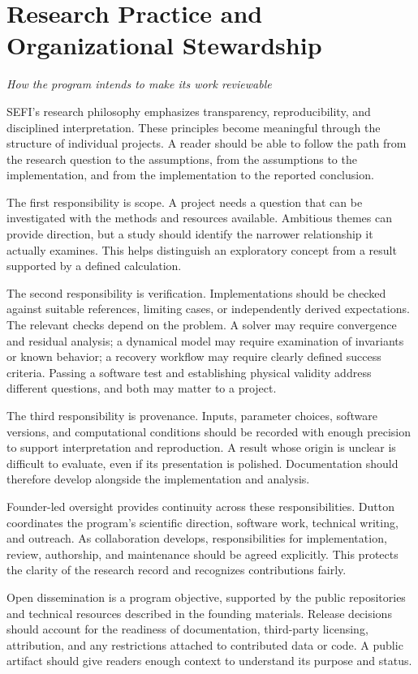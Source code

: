 \documentclass[10pt,letterpaper]{article}
\newcommand{\pageheading}[2]{\clearpage\section{#1}\textit{#2}\par\medskip}
\begin{document}
\pageheading{Research Practice and Organizational Stewardship}{How the program intends to make its work reviewable}
SEFI's research philosophy emphasizes transparency, reproducibility, and disciplined interpretation. These principles become meaningful through the structure of individual projects. A reader should be able to follow the path from the research question to the assumptions, from the assumptions to the implementation, and from the implementation to the reported conclusion.

The first responsibility is scope. A project needs a question that can be investigated with the methods and resources available. Ambitious themes can provide direction, but a study should identify the narrower relationship it actually examines. This helps distinguish an exploratory concept from a result supported by a defined calculation.

The second responsibility is verification. Implementations should be checked against suitable references, limiting cases, or independently derived expectations. The relevant checks depend on the problem. A solver may require convergence and residual analysis; a dynamical model may require examination of invariants or known behavior; a recovery workflow may require clearly defined success criteria. Passing a software test and establishing physical validity address different questions, and both may matter to a project.

The third responsibility is provenance. Inputs, parameter choices, software versions, and computational conditions should be recorded with enough precision to support interpretation and reproduction. A result whose origin is unclear is difficult to evaluate, even if its presentation is polished. Documentation should therefore develop alongside the implementation and analysis.

Founder-led oversight provides continuity across these responsibilities. Dutton coordinates the program's scientific direction, software work, technical writing, and outreach. As collaboration develops, responsibilities for implementation, review, authorship, and maintenance should be agreed explicitly. This protects the clarity of the research record and recognizes contributions fairly.

Open dissemination is a program objective, supported by the public repositories and technical resources described in the founding materials. Release decisions should account for the readiness of documentation, third-party licensing, attribution, and any restrictions attached to contributed data or code. A public artifact should give readers enough context to understand its purpose and status.
\end{document}
